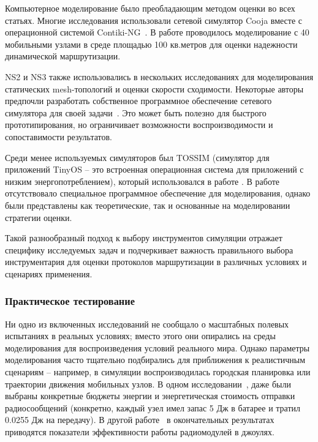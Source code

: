 \documentclass[%
]{report}
\begin{document}
Компьютерное моделирование было преобладающим
методом оценки во всех статьях. Многие
исследования использовали сетевой симулятор
Cooja вместе с операционной системой Contiki-NG~\cite{HECK2025110364,KRENTZ202457}.
В работе \textcite{SHARMA2013416} проводилось
моделирование с 40 мобильными узлами в среде
площадью 100 кв.метров для оценки
надежности динамической маршрутизации.

NS2 и NS3 также использовались в
нескольких исследованиях для моделирования
статических mesh-топологий и оценки скорости
сходимости. Некоторые авторы предпочли разработать
собственное программное обеспечение сетевого симулятора
для своей задачи~\cite{PAN2012952}.
Это может быть полезно для быстрого прототипирования,
но ограничивает возможности воспроизводимости и сопоставимости
результатов.

Среди менее используемых симуляторов был TOSSIM
(симулятор для приложений TinyOS -- это встроенная операционная
система для приложений с низким энергопотреблением),
который использовался в работе
\textcite{KAFI2014181}.
В работе \textcite{ALVAREZ2008240}
отсутствовало специальное программное обеспечение
для моделирования, однако были представлены
как теоретические, так и основанные
на моделировании стратегии оценки.

Такой разнообразный подход к выбору инструментов
симуляции отражает специфику исследуемых задач и
подчеркивает важность правильного выбора инструментария
для оценки протоколов маршрутизации в различных
условиях и сценариях применения.

\subsubsection{Практическое тестирование}\label{field-testing}

Ни одно из включенных исследований
не сообщало о масштабных полевых испытаниях
в реальных условиях; вместо этого они опирались
на среды моделирования для воспроизведения условий реального мира.
Однако параметры моделирования часто тщательно
подбирались для приближения к реалистичным сценариям --
например, в симуляции воспроизводилась
городская планировка
или траектории движения мобильных узлов.
В одном исследовании~\cite{VENKATESHA201537},
даже были выбраны конкретные бюджеты энергии
и энергетическая стоимость отправки радиосообщений
(конкретно, каждый узел имел запас 5 Дж в батарее
и тратил 0.0255 Дж на передачу).
В другой работе~\cite{KRISHNA2016817}
в окончательных результатах приводятся показатели
эффективности работы радиомодулей в джоулях.
\end{document}
